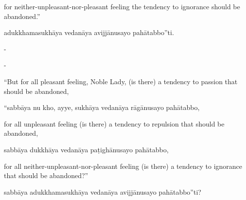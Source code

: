 \begin{samepage}
\begin{leftcolumn*}
for neither-unpleasant-nor-pleasant feeling the tendency to ignorance should be abandoned.”
\end{leftcolumn*}

\begin{rightcolumn}
adukkhamasukhāya vedanāya avijjānusayo pahātabbo”ti.
\end{rightcolumn}
\end{samepage}

\begin{samepage}
\begin{leftcolumn*}
-
\end{leftcolumn*}

\begin{rightcolumn}
-
\end{rightcolumn}
\end{samepage}

\begin{samepage}
\begin{leftcolumn*}
“But for all pleasant feeling, Noble Lady, (is there) a tendency to passion that should be abandoned,
\end{leftcolumn*}

\begin{rightcolumn}
“sabbāya nu kho, ayye, sukhāya vedanāya rāgānusayo pahātabbo,
\end{rightcolumn}
\end{samepage}

\begin{samepage}
\begin{leftcolumn*}
for all unpleasant feeling (is there) a tendency to repulsion that should be abandoned,
\end{leftcolumn*}

\begin{rightcolumn}
sabbāya dukkhāya vedanāya paṭighānusayo pahātabbo,
\end{rightcolumn}
\end{samepage}

\begin{samepage}
\begin{leftcolumn*}
for all neither-unpleasant-nor-pleasant feeling (is there) a tendency to ignorance that should be abandoned?”
\end{leftcolumn*}

\begin{rightcolumn}
sabbāya adukkhamasukhāya vedanāya avijjānusayo pahātabbo”ti?
\end{rightcolumn}
\end{samepage}

